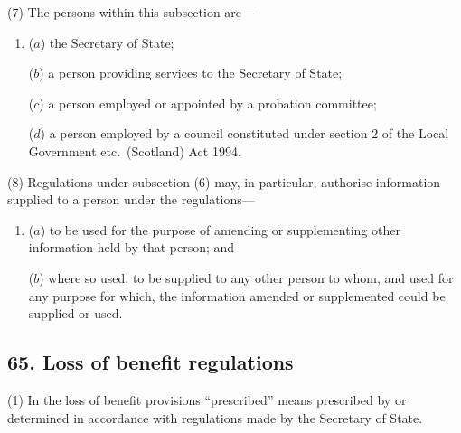 \documentclass[12pt,a4paper]{article}
\begin{document}
(7) The persons within this subsection are—
\begin{enumerate}\item[]
($a$) the Secretary of State;

($b$) a person providing services to the Secretary of State;

($c$) a person employed or appointed by a probation committee;

($d$) a person employed by a council constituted under section 2 of the Local Government etc.\ (Scotland) Act 1994. 
\end{enumerate}

(8) Regulations under subsection (6)  may, in particular, authorise information supplied to a person under the regulations—
\begin{enumerate}\item[]
($a$) to be used for the purpose of amending or supplementing other information held by that person; and

($b$) where so used, to be supplied to any other person to whom, and used for any purpose for which, the information amended or supplemented could be supplied or used.
\end{enumerate}

%
%


\subsection{65. Loss of benefit regulations}

(1) In the loss of benefit provisions “prescribed” means prescribed by or determined in accordance with regulations made by the Secretary of State.
\end{document}
